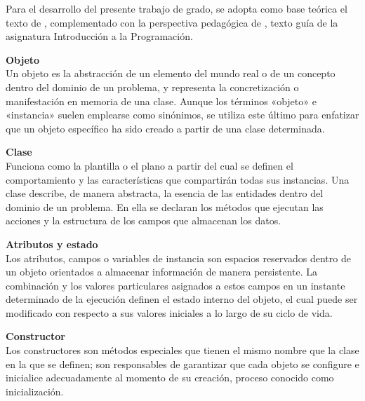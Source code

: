 Para el desarrollo del presente trabajo de grado, se adopta como base teórica 
el texto de \textcite{Wiener2000}, complementado con la perspectiva pedagógica 
de \textcite{Barnes2013}, texto guía de la asignatura Introducción a la 
Programación.
\vspace{1.5em} 

\noindent\textbf{Objeto} \vspace{0.5em} \\
\indent Un objeto es la abstracción de un elemento del mundo real o de un 
concepto dentro del dominio de un problema, y representa la concretización o 
manifestación en memoria de una clase. Aunque los términos «objeto» e 
«instancia» suelen emplearse como sinónimos, se utiliza este último para 
enfatizar que un objeto específico ha sido creado a partir de una clase 
determinada.
\vspace{1.5em}

\noindent\textbf{Clase} \vspace{0.5em} \\ 
\indent Funciona como la plantilla o el plano a partir del cual se definen el 
comportamiento y las características que compartirán todas sus instancias. 
Una clase describe, de manera abstracta, la esencia de las entidades dentro del 
dominio de un problema. En ella se declaran los métodos que ejecutan las 
acciones y la estructura de los campos que almacenan los datos.
\vspace{1.5em}

\noindent\textbf{Atributos y estado} \vspace{0.5em} \\ 
\indent Los atributos, campos o variables de instancia son espacios reservados 
dentro de un objeto orientados a almacenar información de manera persistente. 
La combinación y los valores particulares asignados a estos campos en un 
instante determinado de la ejecución definen el estado interno del objeto, el 
cual puede ser modificado con respecto a sus valores iniciales a lo largo de 
su ciclo de vida.
\vspace{1.5em}

\noindent\textbf{Constructor} \vspace{0.5em} \\ 
\indent Los constructores son métodos especiales que tienen el mismo nombre 
que la clase en la que se definen; son responsables de garantizar que cada 
objeto se configure e inicialice adecuadamente al momento de su creación, 
proceso conocido como inicialización.
\vspace{1.5em}


